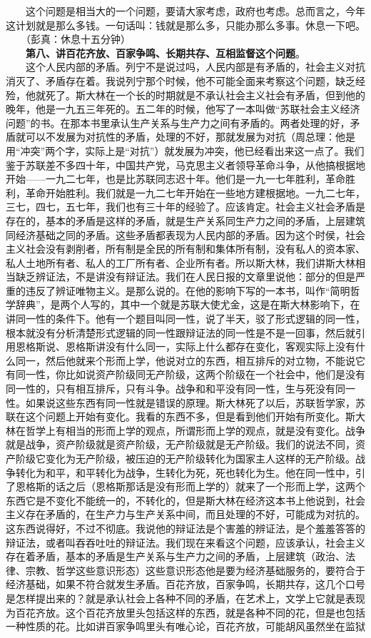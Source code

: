 \documentclass[cn,11pt,chinese]{elegantbook}
\begin{document}
　　这个问题是相当大的一个问题，要请大家考虑，政府也考虑。总而言之，今年这计划就是那么多钱。一句话叫：钱就是那么多，只能办那么多事。休息一下吧。\\
　　（彭真：休息十五分钟）\\
　　\textbf{第八、讲百花齐放、百家争鸣、长期共存、互相监督这个问题}。\\
　　这个人民内部的矛盾。列宁不是说过吗，人民内部是有矛盾的，社会主义对抗消灭了、矛盾存在着。我说列宁那个时候，他不可能全面来考察这个问题，缺乏经殓，他就死了。斯大林在一个长的时期就是不承认社会主义社会有矛盾，但到他的晚年，他是一九五三年死的。五二年的时候，他写了一本叫做“苏联社会主义经济问题”的书。在那本书里承认生产关系与生产力之间有矛盾的。两者处理的好，矛盾就可以不发展为对抗性的矛盾，处理的不好，那就发展为对抗（周总理：他是用“冲突”两个字，实际上是“对抗”）就发展为冲突，他已经看出来这一点了。我们鉴于苏联差不多四十年，中国共产党，马克思主义者领导革命斗争，从他搞根据地开始——一九二七年，也是比苏联同志迟十年。他们是一九一七年胜利，革命胜利，革命开始胜利。我们就是一九二七年开始在一些地方建根据地。一九二七年，三七，四七，五七年，我们也有三十年的经验了。应该肯定。社会主义社会矛盾是存在的，基本的矛盾是这样的矛盾，就是生产关系同生产力之间的矛盾，上层建筑同经济基础之同的矛盾。这些矛盾都表现为人民内部的矛盾。因为这个时侯，社会主义社会没有剥削者，所有制是全民的所有制和集体所有制，没有私人的资本家、私人土地所有者、私人的工厂所有者、企业所有者。所以斯大林，我们讲斯大林相当缺乏辨证法，不是讲没有辩证法。我们在人民日报的文章里说他：部分的但是严重的违反了辨证唯物主义。是那么说的。在他的影响下写的一本书，叫作“简明哲学辞典”，是两个人写的，其中一个就是苏联大使尤金，这是在斯大林影响下，在讲同一性的条件下。他有一个题目叫同一性，说了半天，驳了形式逻辑的同一性，根本就没有分析清楚形式逻辑的同一性跟辩证法的同一性是不是一回事，然后就引用恩格斯说、恩格斯讲没有什么同一，实际上什么都存在变化，客观实际上没有什么同一，然后他就来个形而上学，他说对立的东西，相互排斥的对立物，不能说它有同一性，你比如说资产阶级同无产阶级，这两个阶级在一个社会中，他们是没有同一性的，只有相互排斥，只有斗争。战争和和平没有同一性，生与死没有同一性。如果说这些东西有同一性就是错误的原理。斯大林死了以后，苏联哲学家，苏联在这个问题上开始有变化。我看的东西不多，但是看到他们开始有所变化。斯大林在哲学上有相当的形而上学的观点，所谓形而上学的观点，就是没有变化。战争就是战争，资产阶级就是资产阶级，无产阶级就是无产阶级。我们的说法不同，资产阶级它变化为无产阶级，被压迫的无产阶级转化为国家主人这样的无产阶级。战争转化为和平，和平转化为战争，生转化为死，死也转化为生。他在同一性中，引了恩格斯的话之后（恩格斯那话是没有形而上学的）就来了一个形而上学，这两个东西它是不变化不能统一的，不转化的，但是斯大林在经济这本书上他说到，社会主义存在矛盾的，在生产力与生产关系中间，而且处理的不好，可能成为对抗的。这东西说得好，不过不彻底。我说他的辩证法是个害羞的辨证法，是个羞羞答答的辩证法，或者叫吞吞吐吐的辩证法。我们现在来看这个问题，应该承认，社会主义存在着矛盾，基本的矛盾是生产关系与生产力之间的矛盾，上层建筑（政治、法律、宗教、哲学这些意识形态）这些意识形态他是要为经济基础服务的，要符合于经济基础，如果不符合就发生矛盾。百花齐放，百家争鸣，长期共存，这几个口号是怎样提出来的？就是承认社会上各种不同的矛盾，在艺术上，文学上它就是表现为百花齐放。这个百花齐放里头包括这样的东西，就是各种不同的花，但是也包括一种性质的花。比如讲百家争鸣里头有唯心论，百花齐放，可能胡风虽然坐在监狱
\end{document}
